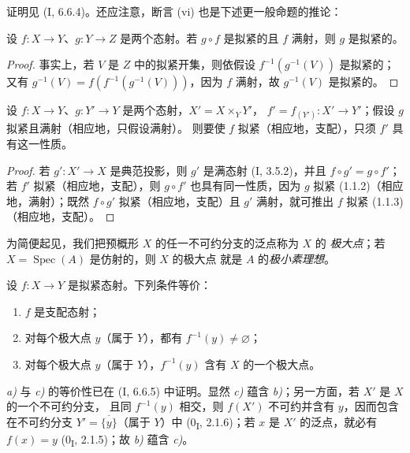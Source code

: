 证明见 (I, 6.6.4)。还应注意，断言 (vi) 也是下述更一般命题的推论：

\begin{proposition}[1.1.3]
\label{IV.1.1.3-fr}
设 $f:X\to Y$、$g:Y\to Z$ 是两个态射。若 $g\circ f$ 是拟紧的且 $f$
满射，则 $g$ 是拟紧的。
\end{proposition}

\begin{proof}
事实上，若 $V$ 是 $Z$ 中的拟紧开集，则依假设
$f^{-1}(g^{-1}(V))$ 是拟紧的；又有
$g^{-1}(V)=f(f^{-1}(g^{-1}(V)))$，因为 $f$ 满射，故 $g^{-1}(V)$ 是拟紧的。
\end{proof}

\begin{corollary}[1.1.4]
\label{IV.1.1.4-fr}
设 $f:X\to Y$、$g:Y'\to Y$ 是两个态射，$X'=X\times_Y Y'$，
$f'=f_{(Y')}:X'\to Y'$；假设 $g$ 拟紧且满射（相应地，只假设满射）。
则要使 $f$ 拟紧（相应地，支配），只须 $f'$ 具有这一性质。
\end{corollary}

\begin{proof}
若 $g':X'\to X$ 是典范投影，则 $g'$ 是满态射 (I, 3.5.2)，并且
$f\circ g'=g\circ f'$；若 $f'$ 拟紧（相应地，支配），则
$g\circ f'$ 也具有同一性质，因为 $g$ 拟紧 (1.1.2)（相应地，满射）；既然
$f\circ g'$ 拟紧（相应地，支配）且 $g'$ 满射，就可推出 $f$ 拟紧
(1.1.3)（相应地，支配）。
\end{proof}


为简便起见，我们把预概形 $X$ 的任一不可约分支的泛点称为 $X$ 的
\emph{极大点}；若 $X=\operatorname{Spec}(A)$ 是仿射的，则 $X$ 的极大点
就是 $A$ 的\emph{极小素理想}。

\begin{proposition}[1.1.5]
\label{IV.1.1.5-fr}
设 $f:X\to Y$ 是拟紧态射。下列条件等价：
\begin{enumerate}
  \item[a)] $f$ 是支配态射；
  \item[b)] 对每个极大点 $y$（属于 $Y$），都有
  $f^{-1}(y)\neq\varnothing$；
  \item[c)] 对每个极大点 $y$（属于 $Y$），$f^{-1}(y)$ 含有 $X$ 的一个极大点。
\end{enumerate}
\end{proposition}

\emph{a)} 与 \emph{c)} 的等价性已在 (I, 6.6.5) 中证明。显然
\emph{c)} 蕴含 \emph{b)}；另一方面，若 $X'$ 是 $X$ 的一个不可约分支，
且同 $f^{-1}(y)$ 相交，则 $f(X')$ 不可约并含有 $y$，因而包含在不可约分支
$Y'=\overline{\{y\}}$（属于 $Y$）中 (0\textsubscript{I}, 2.1.6)；若 $x$
是 $X'$ 的泛点，就必有 $f(x)=y$ (0\textsubscript{I}, 2.1.5)；故
\emph{b)} 蕴含 \emph{c)}。

